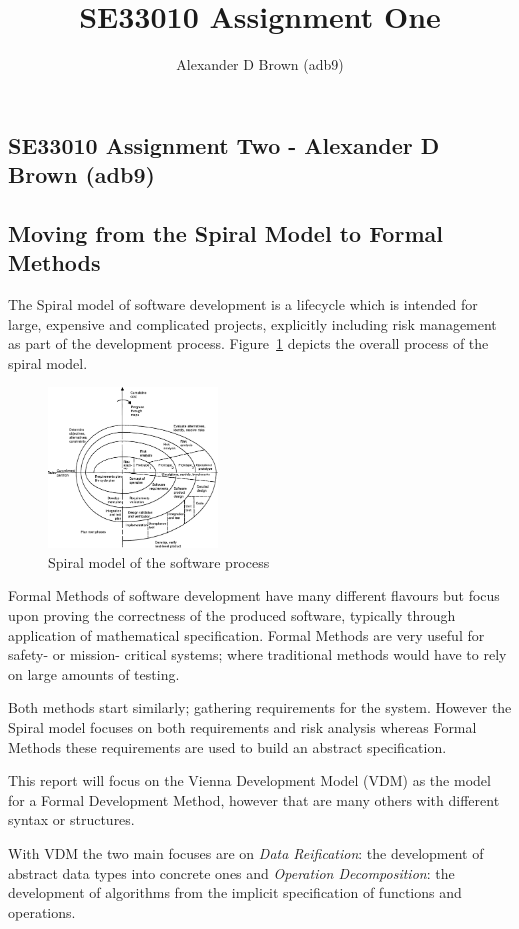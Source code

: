 \documentclass[a4paper, notitlepage, fleqn]{article}
\title{SE33010 Assignment One}
\author{Alexander D Brown (adb9)}
\begin{document}
\begin{centering}
\section*{SE33010 Assignment Two - Alexander D Brown (adb9)}
\subsection*{Moving from the Spiral Model to Formal Methods}
\end{centering}

The Spiral model of software development is a lifecycle which is intended for large, expensive and
complicated projects, explicitly including risk management as part of the development process. 
Figure~\ref{fig:spiral} depicts the overall process of the spiral model.

\begin{figure}[h]
\centering
\includegraphics[width=0.4\textwidth]{img/spiral}
\caption{Spiral model of the software process\cite{59}}\label{fig:spiral}
\end{figure}

Formal Methods of software development have many different flavours but focus upon proving the
correctness of the produced software, typically through application of mathematical specification.
Formal Methods are very useful for safety- or mission- critical systems; where traditional methods
would have to rely on large amounts of testing.

Both methods start similarly; gathering requirements for the system. However the Spiral model 
focuses on both requirements and risk analysis whereas Formal Methods these requirements are used
to build an abstract specification.

This report will focus on the Vienna Development Model (VDM) as the model for a Formal Development
Method, however that are many others with different syntax or structures.

With VDM the two main focuses are on \emph{Data Reification}: the development of abstract data 
types into concrete ones and \emph{Operation Decomposition}: the development of algorithms from
the implicit specification of functions and operations.
\end{document}
